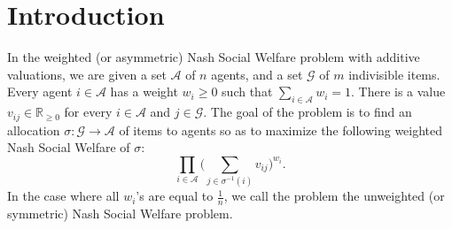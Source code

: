 \documentclass[10pt,a4paper]{article}
\theoremstyle{definition}
\theoremstyle{plain}
\newcommand\calA{{\mathcal{A}}}
\newcommand\calG{{\mathcal{G}}}
\newcommand{\R}{{\mathbb{R}}}
\begin{document}
\maketitle
\begin{abstract}
    We give the first $O(1)$-approximation for the weighted Nash Social Welfare problem with additive valuations. The approximation ratio we obtain is $e^{1/e} + \epsilon \approx 1.445 + \epsilon$, which matches the best known approximation ratio for the unweighted case \cite{BKV18}.  
    
    Both our algorithm and analysis are simple. We solve a natural configuration LP for the problem, and obtain the allocation of items to agents using the Shmoys-Tardos rounding algorithm developed for  unrelated machine scheduling problems \cite{ST93}. In the analysis, we show that the approximation ratio of the algorithm is at most the worst gap between the Nash social welfare of the optimum allocation and that of an EF1 allocation, for an unweighted Nash Social Welfare instance with identical additive valuations. This was shown to be at most $e^{1/e} \approx 1.445$ by Barman, Krishnamurthy and Vaish\ \cite{BKV18}, leading to our approximation ratio. 
\end{abstract}

 


\section{Introduction}


In the weighted (or asymmetric) Nash Social Welfare problem with additive valuations, we are given a set $\calA$ of $n$ agents, and a set $\calG$ of $m$ indivisible items. Every agent $i \in \calA$ has a weight $w_i \geq 0$ such that $\sum_{i \in \calA}w_i = 1$. There is a value $v_{ij} \in \R_{\geq 0}$ for every $i \in \calA$ and $j \in \calG$.  The goal of the problem is to find an allocation $\sigma: \calG \to \calA$ of items to agents so as to maximize the following weighted Nash Social Welfare of $\sigma$: 
\begin{equation*}
    \prod_{i \in \calA} \bigg(\sum_{j \in \sigma^{-1}(i)}v_{ij}\bigg)^{w_i}.
\end{equation*}
In the case where all $w_i$'s are equal to $\frac1n$, we call the problem the unweighted (or symmetric) Nash Social Welfare problem.
\end{document}
